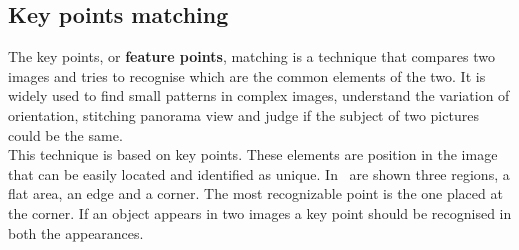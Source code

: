 \subsection{Key points matching}
The key points, or \textbf{feature points}, matching is a technique that compares two images and tries to recognise which are the common elements of the two. It is widely used to find small patterns in complex images, understand the variation of orientation, stitching panorama view and judge if the subject of two pictures could be the same.\\
This technique is based on key points. These elements are position in the image that can be easily located and identified as unique. In~ are shown three regions, a flat area, an edge and a corner. The most recognizable point is the one placed at the corner. If an object appears in two images a key point should be recognised in both the appearances.

